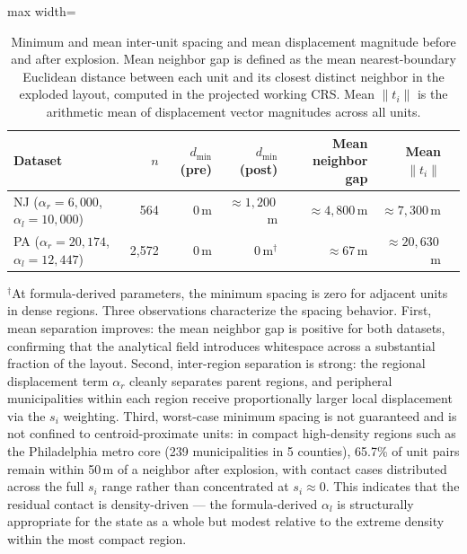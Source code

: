\documentclass[12pt, a4paper]{article}
\numberwithin{equation}{section}
\begin{document}
\begin{table}[h]
\centering
\caption{Minimum and mean inter-unit spacing and mean displacement magnitude before and after explosion. Mean neighbor gap is defined as the mean nearest-boundary Euclidean distance between each unit and its closest distinct neighbor in the exploded layout, computed in the projected working CRS. Mean $\|t_i\|$ is the arithmetic mean of displacement vector magnitudes across all units.}
\label{tab:dmin}
\begin{adjustbox}{max width=\textwidth}
\begin{tabular}{lrrrrrr}
\toprule
\textbf{Dataset} & \textbf{$n$} & \textbf{$d_{\min}$ (pre)} & \textbf{$d_{\min}$ (post)} & \textbf{Mean neighbor gap} & \textbf{Mean $\|t_i\|$} \\
\midrule
NJ ($\alpha_r=6{,}000$, $\alpha_l=10{,}000$)   & 564   & 0\,m & $\approx 1{,}200$\,m & $\approx 4{,}800$\,m & $\approx 7{,}300$\,m \\
PA ($\alpha_r=20{,}174$, $\alpha_l=12{,}447$)  & 2{,}572 & 0\,m & 0\,m$^{\dagger}$ & $\approx 67$\,m & $\approx 20{,}630$\,m \\
\bottomrule
\end{tabular}
\end{adjustbox}
\end{table}

$^{\dagger}$At formula-derived parameters, the minimum spacing is zero for adjacent units in dense regions. Three observations characterize the spacing behavior. First, mean separation improves: the mean neighbor gap is positive for both datasets, confirming that the analytical field introduces whitespace across a substantial fraction of the layout. Second, inter-region separation is strong: the regional displacement term $\alpha_r$ cleanly separates parent regions, and peripheral municipalities within each region receive proportionally larger local displacement via the $s_i$ weighting. Third, worst-case minimum spacing is not guaranteed and is not confined to centroid-proximate units: in compact high-density regions such as the Philadelphia metro core (239 municipalities in 5 counties), 65.7\% of unit pairs remain within 50\,m of a neighbor after explosion, with contact cases distributed across the full $s_i$ range rather than concentrated at $s_i \approx 0$. This indicates that the residual contact is density-driven --- the formula-derived $\alpha_l$ is structurally appropriate for the state as a whole but modest relative to the extreme density within the most compact region.
\end{document}
